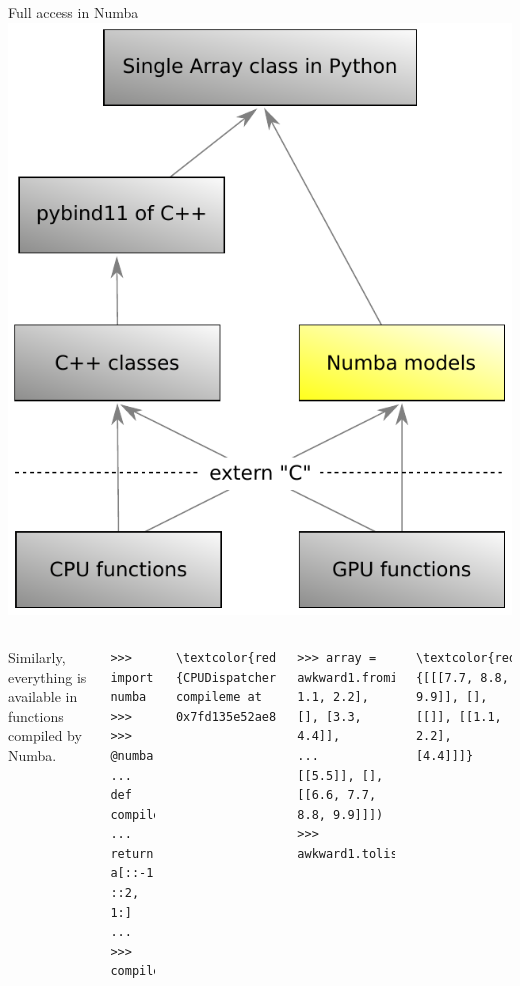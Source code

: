 \documentclass[aspectratio=169]{beamer}
\begin{document}
\begin{frame}[fragile]{Full access in Numba}
\large
\vspace{0.35 cm}
\hfill\mbox{\includegraphics[height=4 cm]{awkward-1-0-layers-mini-numba.pdf}\hspace{-0.75 cm}}

\vspace{-4 cm}
\begin{columns}
Similarly, everything is available in functions compiled by Numba.

\scriptsize
\vspace{0.1 cm}
\begin{verbatim}
>>> import numba
>>>
>>> @numba.jit(nopython=True)
... def compileme(a):
...     return a[::-1, ::2, 1:]
... 
>>> compileme
\end{verbatim}
\begin{Verbatim}[commandchars=\\\{\}]
\textcolor{red}{CPUDispatcher(<function compileme at 0x7fd135e52ae8>)}
\end{Verbatim}
\begin{verbatim}
>>> array = awkward1.fromiter([[[0.0, 1.1, 2.2], [], [3.3, 4.4]],
...                            [[5.5]], [], [[6.6, 7.7, 8.8, 9.9]]])
>>> awkward1.tolist(compileme(array))
\end{verbatim}
\begin{Verbatim}[commandchars=\\\{\}]
\textcolor{red}{[[[7.7, 8.8, 9.9]], [], [[]], [[1.1, 2.2], [4.4]]]}
\end{Verbatim}

\large
\vspace{0.25 cm}

\vspace{0.25 cm}

\vspace{5 cm}
\end{columns}
\end{frame}
\end{document}

